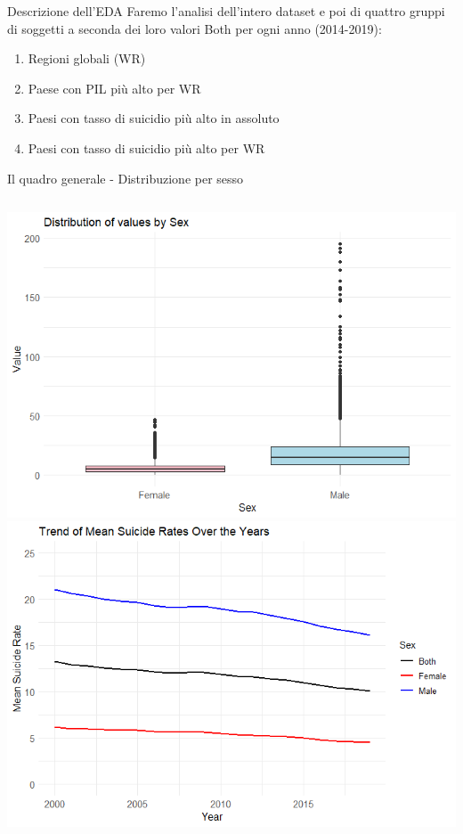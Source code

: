 \documentclass{beamer}
\begin{document}
\begin{frame}{Descrizione dell'EDA}
	Faremo l'analisi dell'intero dataset e poi di quattro
	gruppi di soggetti a seconda dei loro valori
	Both per ogni anno (2014-2019):
	\begin{enumerate}
		\item Regioni globali (WR)
		\item Paese con PIL più alto per WR
		\item Paesi con tasso di suicidio più alto in assoluto
		\item Paesi con tasso di suicidio più alto per WR
	\end{enumerate}
\end{frame}

\begin{frame}{Il quadro generale - Distribuzione per sesso}
	\begin{columns}
			\includegraphics[width=\linewidth]{Images/1 - Sex2.png}
			\includegraphics[width=\linewidth]{Images/2 - Globtrend2.png}
	\end{columns}
\end{frame}
\end{document}
